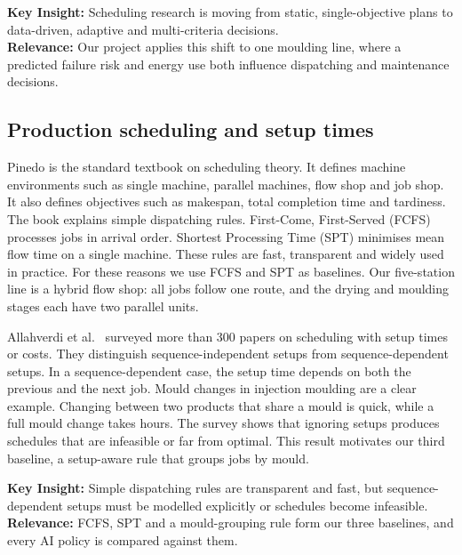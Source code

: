 \documentclass[11pt,a4paper]{article}
\begin{document}
\textbf{Key Insight:} Scheduling research is moving from static, single-objective plans to data-driven, adaptive and multi-criteria decisions.\\
\textbf{Relevance:} Our project applies this shift to one moulding line, where a predicted failure risk and energy use both influence dispatching and maintenance decisions.

\subsection{Production scheduling and setup times}
Pinedo \cite{pinedo2016} is the standard textbook on scheduling theory. It defines machine environments such as single machine, parallel machines, flow shop and job shop. It also defines objectives such as makespan, total completion time and tardiness. The book explains simple dispatching rules. First-Come, First-Served (FCFS) processes jobs in arrival order. Shortest Processing Time (SPT) minimises mean flow time on a single machine. These rules are fast, transparent and widely used in practice. For these reasons we use FCFS and SPT as baselines. Our five-station line is a hybrid flow shop: all jobs follow one route, and the drying and moulding stages each have two parallel units.

Allahverdi et al.\ \cite{allahverdi2008} surveyed more than 300 papers on scheduling with setup times or costs. They distinguish sequence-independent setups from sequence-dependent setups. In a sequence-dependent case, the setup time depends on both the previous and the next job. Mould changes in injection moulding are a clear example. Changing between two products that share a mould is quick, while a full mould change takes hours. The survey shows that ignoring setups produces schedules that are infeasible or far from optimal. This result motivates our third baseline, a setup-aware rule that groups jobs by mould.

\textbf{Key Insight:} Simple dispatching rules are transparent and fast, but sequence-dependent setups must be modelled explicitly or schedules become infeasible.\\
\textbf{Relevance:} FCFS, SPT and a mould-grouping rule form our three baselines, and every AI policy is compared against them.
\end{document}

